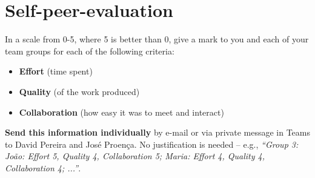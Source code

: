 \documentclass[11pt]{article}
\begin{document}




\section*{Self-peer-evaluation}
\begin{myExercise}
  In a scale from 0-5, where 5 is better than 0, give a mark to you and each of your team groups for each of the following criteria:
  \begin{itemize}
    \item \textbf{Effort} (time spent)
    \item \textbf{Quality} (of the work produced)
    \item \textbf{Collaboration} (how easy it was to meet and interact)
  \end{itemize}
  \textbf{Send this information individually} by e-mail or via private message in Teams to David Pereira and Jos\'{e} Proen\c{c}a. No justification is needed -- e.g., \emph{``Group 3: Jo\~{a}o: Effort 5, Quality 4, Collaboration 5; Maria: Effort 4, Quality 4, Collaboration 4; ...''}.
\end{myExercise}


\end{document}
